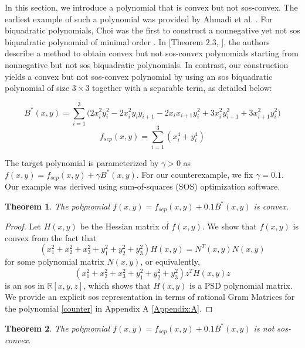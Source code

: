 \documentclass[12pt]{elsarticle}
\newtheorem{theorem}{Theorem}[section]
\theoremstyle{definition}
\begin{document}
In this section, we introduce a polynomial that is convex but not sos-convex. The earliest example of such a polynomial was provided by Ahmadi et al. \citep{ahmadi2012convex}. For biquadratic polynomials, Choi was the first to construct a nonnegative yet not sos biquadratic polynomial of minimal order \cite{choi1975positive}. In [Theorem $2.3$, \cite{ahmadi2013np}], the authors describe a method to obtain convex but not sos-convex polynomials starting from nonnegative but not sos biquadratic polynomials. In contrast, our construction yields a convex but not sos-convex polynomial by using an sos biquadratic polynomial of size $3\times 3$ together with a separable term, as detailed below:

\[
    B^*(x,y) = \sum_{i=1}^3 \Big( 2 x_i^2 y_i^2 - 2 x_i^2 y_i y_{i+1} - 2 x_i x_{i+1} y_i^2 + 3 x_i^2 y_{i+1}^2 + 3 x_{i+1}^2 y_i^2 \Big)
\]
\[
    f_{sep}(x,y) = \sum_{i=1}^3 \left(x_i^4 + y_i^4\right) 
    \]

The target polynomial is parameterized by $\gamma > 0$ as $f(x,y) = f_{sep}(x,y) + \gamma B^*(x,y)$. For our counterexample, we fix $\gamma = 0.1$. Our example was derived using sum-of-squares (SOS) optimization software.

\begin{theorem}
    The polynomial $f(x,y) = f_{sep}(x,y) + 0.1 B^*(x,y)$ is convex.
\end{theorem}

\begin{proof}
    Let $H(x,y)$ be the Hessian matrix of $f(x,y)$. We show that $f(x,y)$ is convex from the fact that
    \[
    (x_1^2+x_2^2 +x_3^2 + y_1^2+y_2^2 + y_3^2)H(x,y)=N^T(x,y)N(x,y)
    \]
for some polynomial matrix $N(x,y)$, or equivalently,
\begin{equation}\label{counter}
(x_1^2+x_2^2 +x_3^2 + y_1^2+y_2^2 + y_3^2)z^TH(x,y)z
\end{equation}
is an sos in $\mathbb{R}[x,y,z]$, which shows that $H(x,y)$ is a PSD polynomial matrix. We provide an explicit sos representation in terms of rational Gram Matrices for the polynomial \eqref{counter} in Appendix A \ref{Appendix:A}.
\end{proof}

\begin{theorem}
    The polynomial $f(x,y) = f_{sep}(x,y) + 0.1 B^*(x,y)$ is not sos-convex.
\end{theorem}
\end{document}
